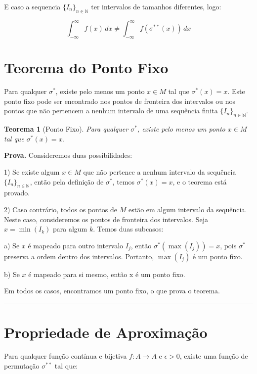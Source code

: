 \documentclass[12pt,a4paper]{article}
\newtheorem{theorem}{Teorema}
\newenvironment{proof}[1][Prova]{\textbf{#1.} }{\ \rule{0.5em}{0.5em}}
\begin{document}
E caso a sequencia $\{I_n\}_{n\in\mathbb{N}}$ ter intervalos de tamanhos diferentes, logo:

\begin{equation}
   \int_{-\infty}^{\infty} f(x)\, dx \neq \int_{-\infty}^{\infty} f(\sigma^{**}(x))\, dx
\end{equation}


\section{Teorema do Ponto Fixo}

Para qualquer $\sigma^*$, existe pelo menos um ponto $x \in M$ tal que $\sigma^*(x) = x$. Este ponto fixo pode ser encontrado nos pontos de fronteira dos intervalos ou nos pontos que não pertencem a nenhum intervalo de uma sequência finita $\{I_n\}_{n\in\mathbb{N}}$.

\begin{theorem}[Ponto Fixo]
Para qualquer $\sigma^*$, existe pelo menos um ponto $x \in M$ tal que $\sigma^*(x) = x$.
\end{theorem}

\begin{proof}
Consideremos duas possibilidades:

1) Se existe algum $x \in M$ que não pertence a nenhum intervalo da sequência $\{I_n\}_{n\in\mathbb{N}}$, então pela definição de $\sigma^*$, temos $\sigma^*(x) = x$, e o teorema está provado.

2) Caso contrário, todos os pontos de $M$ estão em algum intervalo da sequência. Neste caso, consideremos os pontos de fronteira dos intervalos. Seja $x = \min(I_k)$ para algum $k$. Temos duas subcasos:

   a) Se $x$ é mapeado para outro intervalo $I_j$, então $\sigma^*(\max(I_j)) = x$, pois $\sigma^*$ preserva a ordem dentro dos intervalos. Portanto, $\max(I_j)$ é um ponto fixo.
   
   b) Se $x$ é mapeado para si mesmo, então x é um ponto fixo.

Em todos os casos, encontramos um ponto fixo, o que prova o teorema.
\end{proof}


\section{Propriedade de Aproximação}

Para qualquer função contínua e bijetiva $f: A \to A$ e $\epsilon > 0$, existe uma função de permutação $\sigma^{**}$ tal que:
\end{document}
